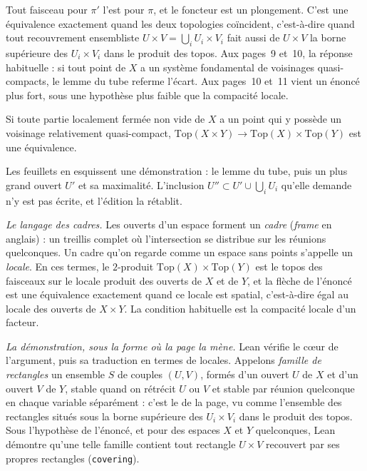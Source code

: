 Tout faisceau pour $\pi'$ l'est pour $\pi$, et le foncteur est un plongement. C'est une équivalence exactement quand les deux topologies coïncident, c'est-à-dire quand tout recouvrement ensembliste $U \times V = \bigcup_i U_i \times V_i$ fait aussi de $U \times V$ la borne supérieure des $U_i \times V_i$ dans le produit des topos. Aux pages~9 et~10, la réponse habituelle : si tout point de $X$ a un système fondamental de voisinages quasi-compacts, le lemme du tube referme l'écart. Aux pages~10 et~11 vient un énoncé plus fort, sous une hypothèse plus faible que la compacité locale.

\begin{encadre}
\begin{theoreme}\label{thm:161-3-produit}
Si toute partie localement fermée non vide de $X$ a un point qui y possède un voisinage relativement quasi-compact, $\mathrm{Top}(X \times Y) \to \mathrm{Top}(X) \times \mathrm{Top}(Y)$ est une équivalence.
\end{theoreme}
\end{encadre}

Les feuillets en esquissent une démonstration : le lemme du tube, puis un plus grand ouvert $U'$ et sa maximalité. L'inclusion $U'' \subset U' \cup \bigcup_i U_i$ qu'elle demande n'y est pas écrite, et l'édition la rétablit.

\noindent\emph{Le langage des cadres.} Les ouverts d'un espace forment un \emph{cadre} (\emph{frame} en anglais) : un treillis complet où l'intersection se distribue sur les réunions quelconques. Un cadre qu'on regarde comme un espace sans points s'appelle un \emph{locale}. En ces termes, le $2$-produit $\mathrm{Top}(X) \times \mathrm{Top}(Y)$ est le topos des faisceaux sur le locale produit des ouverts de $X$ et de $Y$, et la flèche de l'énoncé est une équivalence exactement quand ce locale est spatial, c'est-à-dire égal au locale des ouverts de $X \times Y$. La condition habituelle est la compacité locale d'un facteur.

\noindent\emph{La démonstration, sous la forme où la page la mène.} Lean vérifie le cœur de l'argument, puis sa traduction en termes de locales. Appelons \emph{famille de rectangles} un ensemble $S$ de couples $(U, V)$, formés d'un ouvert $U$ de $X$ et d'un ouvert $V$ de $Y$, stable quand on rétrécit $U$ ou $V$ et stable par réunion quelconque en chaque variable séparément : c'est le  de la page, vu comme l'ensemble des rectangles situés sous la borne supérieure des $U_i \times V_i$ dans le produit des topos. Sous l'hypothèse de l'énoncé, et pour des espaces $X$ et $Y$ quelconques, Lean démontre qu'une telle famille contient tout rectangle $U \times V$ recouvert par ses propres rectangles (\texttt{covering}).

